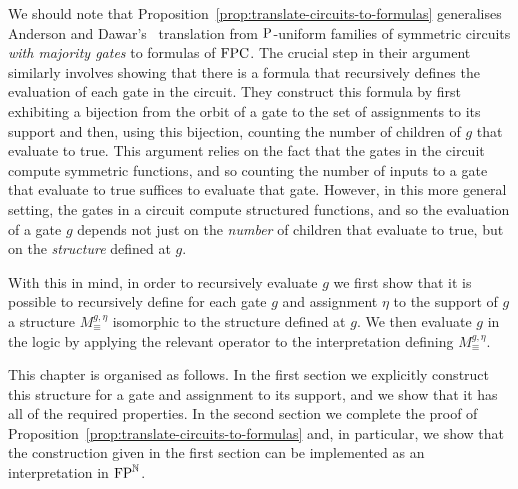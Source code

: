 \documentclass[../main/thesis.tex]{subfiles}
\begin{document}
We should note that Proposition~\ref{prop:translate-circuits-to-formulas}
generalises Anderson and Dawar's~\cite{AndersonD17} translation from
$\mathrm{P}$-uniform families of symmetric circuits \emph{with majority gates} to
formulas of $\text{\upshape FPC}$. The crucial step in their argument similarly involves
showing that there is a formula that recursively defines the evaluation of each
gate in the circuit. They construct this formula by first exhibiting a bijection
from the orbit of a gate to the set of assignments to its support and then,
using this bijection, counting the number of children of $g$ that evaluate to
true. This argument relies on the fact that the gates in the circuit compute
symmetric functions, and so counting the number of inputs to a gate that
evaluate to true suffices to evaluate that gate. However, in this more general
setting, the gates in a circuit compute structured functions, and so the
evaluation of a gate $g$ depends not just on the \emph{number} of children that
evaluate to true, but on the \emph{structure} defined at $g$.

With this in mind, in order to recursively evaluate $g$ we first show that it is
possible to recursively define for each gate $g$ and assignment $\eta$ to the
support of $g$ a structure $M^{g, \eta}_\equiv$ isomorphic to the structure
defined at $g$. We then evaluate $g$ in the logic by applying the relevant
operator to the interpretation defining $M^{g, \eta}_{\equiv}$. 

This chapter is organised as follows. In the first section we explicitly
construct this structure for a gate and assignment to its support, and we show
that it has all of the required properties. In the second section we complete
the proof of Proposition~\ref{prop:translate-circuits-to-formulas} and, in
particular, we show that the construction given in the first section can be
implemented as an interpretation in $\text{\upshape FP}^{\mathbb{N}}$.





\end{document}
